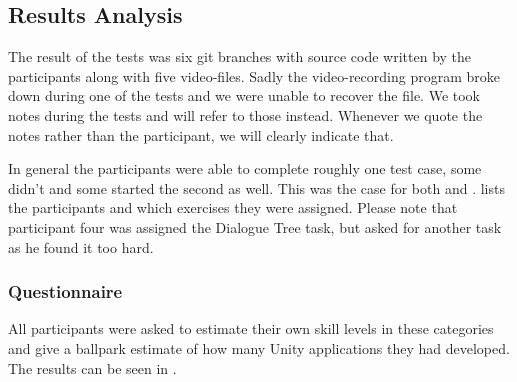 \subsection{Results Analysis} \label{sec:test-results}
The result of the tests was six git branches with source code written by the participants along with five video-files. Sadly the video-recording program broke down during one of the tests and we were unable to recover the file. We took notes during the tests and will refer to those instead. Whenever we quote the notes rather than the participant, we will clearly indicate that.

In general the participants were able to complete roughly one test case, some didn't and some started the second as well. This was the case for both \fsh and \csh.  lists the participants and which exercises they were assigned. Please note that participant four was assigned the Dialogue Tree task, but asked for another task as he found it too hard.


\subsubsection{Questionnaire}
All participants were asked to estimate their own skill levels in these categories and give a ballpark estimate of how many Unity applications they had developed. The results can be seen in .


\newcommand{\mn}{\newmoon}
\newcommand{\mns}{\fullmoon}

